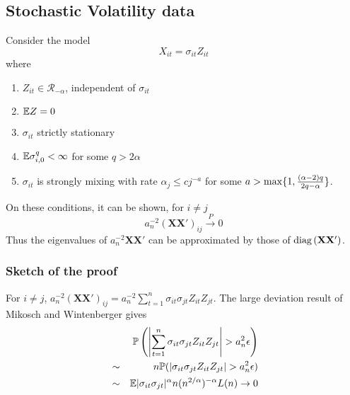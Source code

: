 \documentclass{beamer}
\renewcommand{\P}{
\mathbb P
}
\begin{document}
\subsection{Stochastic Volatility data}
Consider the model
\[
X_{it} = \sigma_{it} Z_{it}
\]
where
\begin{enumerate}
\item $Z_{it} \in \mathcal R_{-\alpha}$, independent of $\sigma_{it}$
\item $\mathbb{E} Z = 0$
\item $\sigma_{it}$ strictly stationary
\item $\mathbb{E} \sigma_{i,0}^q < \infty$ for some $q > 2\alpha$
\item $\sigma_{it}$ is strongly mixing with rate $\alpha_j \leq c
  j^{-a}$ for some $a > \max\{1, {(\alpha - 2) q \over 2 q - \alpha}\}$.
\end{enumerate}
On these conditions, it can be shown, for $i \neq j$
\[
a_n^{-2 }(\mathbf{XX'})_{ij} \overset{P}{\to} 0
\]
Thus the eigenvalues of $a_n^{-2 } \mathbf{XX'}$ can be approximated by those
of $\text{diag\,}(\mathbf{XX'})$.

\begin{frame}
  \frametitle{Sketch of the proof}
  For $i \neq j$, $    a_n^{-2} (\mathbf{XX'})_{ij} = a_n^{-2} \sum_{t=1}^n
  \sigma_{it} \sigma_{jt} Z_{it} Z_{jt}$. The large deviation result
  of Mikosch and Wintenberger gives
  \begin{eqnarray*}
    && \P\left(
      \left|\sum_{t=1}^n \sigma_{it} \sigma_{jt} Z_{it} Z_{jt}\right| > a_n^2 \epsilon
    \right) \\
    &\sim& n \P(|\sigma_{it} \sigma_{jt} Z_{it} Z_{jt}| > a_n^2
    \epsilon) \\
    &\sim& \E |\sigma_{it} \sigma_{jt}|^\alpha n
    (n^{2/\alpha})^{-\alpha} L(n) \to 0
  \end{eqnarray*}
\end{frame}


\end{document}
